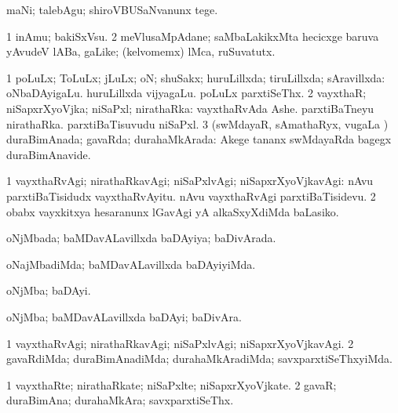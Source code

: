\noindent 
\gl{\akirx}
\expl{}
\bmng
 maNi; talebAgu; shiroVBUSaNvanunx tege. 
\emng
\eentry

\bentry
{} 
\gl{\nA}
\bmng
\bnum
\num{1} inAmu; bakiSxVsu. 
\num{2} meVlusaMpAdane; saMbaLakikxMta hecicxge baruva yAvudeV lABa, gaLike; (kelvomemx) lMca, ruSuvatutx. 
\enum
\emng
\eentry

\bentry
{} 
\gl{\gu}
\expl{}
\bmng
\bnum
\num{1} poLuLx; ToLuLx; jLuLx; oN; shuSakx; huruLillxda; tiruLillxda; sAravillxda:  oNbaDAyigaLu.  huruLillxda vijyagaLu.  poLuLx parxtiSeThx. 
\num{2} vayxthaR; niSapxrXyoVjka; niSaPxl; nirathaRka:  vayxthaRvAda Ashe.  parxtiBaTneyu nirathaRka.  parxtiBaTisuvudu niSaPxl. 
\num{3} (swMdayaR, sAmathaRyx, \mo vugaLa \vi) duraBimAnada; gavaRda; durahaMkArada:  Akege tananx swMdayaRda bagegx duraBimAnavide. 
\enum
\emng

\noindent 
\gl{\pagu}
\expl{}
\bmng
\bnum
\num{1}  vayxthaRvAgi; nirathaRkavAgi; niSaPxlvAgi; niSapxrXyoVjkavAgi:  nAvu parxtiBaTisidudx vayxthaRvAyitu. nAvu vayxthaRvAgi parxtiBaTisidevu. 
\num{2}  obabx vayxkitxya hesaranunx lGavAgi yA alkaSxyXdiMda baLasiko. 
\enum
\emng
\eentry

\bentry
{} 
\gl{\gu}
\expl{}
\bmng
 oNjMbada; baMDavALavillxda baDAyiya; baDivArada. 
\emng
\eentry

\bentry
{} 
\gl{\kirxvi}
\expl{}
\bmng
 oNajMbadiMda; baMDavALavillxda baDAyiyiMda. 
\emng
\eentry

\bentry
{} 
\gl{\nA}
\expl{}
\bmng
 oNjMba; baDAyi. 
\emng
\eentry

\bentry
{} 
\gl{\nA}
\expl{}
\bmng
 oNjMba; baMDavALavillxda baDAyi; baDivAra. 
\emng
\eentry

\bentry
{} 
\gl{\kirxvi}
\expl{}
\bmng
\bnum
\num{1} vayxthaRvAgi; nirathaRkavAgi; niSaPxlvAgi; niSapxrXyoVjkavAgi. 
\num{2} gavaRdiMda; duraBimAnadiMda; durahaMkAradiMda; savxparxtiSeThxyiMda. 
\enum
\emng
\eentry

\bentry
{} 
\gl{\nA}
\expl{}
\bmng
\bnum
\num{1} vayxthaRte; nirathaRkate; niSaPxlte; niSapxrXyoVjkate. 
\num{2} gavaR; duraBimAna; durahaMkAra; savxparxtiSeThx. 
\enum
\emng
\eentry


